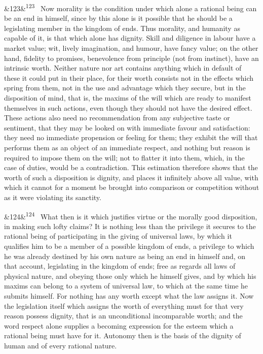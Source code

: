 \documentclass[12pt]{article}
\newcommand{\para}[1][]{\par\noindent\ifx&#1&\else\textsuperscript{\footnotesize #1}~\fi}
\begin{document}
\para[123] Now morality is the condition under which alone a rational being can be an end in himself, since by this alone is it possible that he should be a legislating member in the kingdom of ends. Thus morality, and humanity as capable of it, is that which alone has dignity. Skill and diligence in labour have a market value; wit, lively imagination, and humour, have fancy value; on the other hand, fidelity to promises, benevolence from principle (not from instinct), have an intrinsic worth. Neither nature nor art contains anything which in default of these it could put in their place, for their worth consists not in the effects which spring from them, not in the use and advantage which they secure, but in the disposition of mind, that is, the maxims of the will which are ready to manifest themselves in such actions, even though they should not have the desired effect. These actions also need no recommendation from any subjective taste or sentiment, that they may be looked on with immediate favour and satisfaction: they need no immediate propension or feeling for them; they exhibit the will that performs them as an object of an immediate respect, and nothing but reason is required to impose them on the will; not to flatter it into them, which, in the case of duties, would be a contradiction. This estimation therefore shows that the worth of such a disposition is dignity, and places it infinitely above all value, with which it cannot for a moment be brought into comparison or competition without as it were violating its sanctity.

\para[124] What then is it which justifies virtue or the morally good disposition, in making such lofty claims? It is nothing less than the privilege it secures to the rational being of participating in the giving of universal laws, by which it qualifies him to be a member of a possible kingdom of ends, a privilege to which he was already destined by his own nature as being an end in himself and, on that account, legislating in the kingdom of ends; free as regards all laws of physical nature, and obeying those only which he himself gives, and by which his maxims can belong to a system of universal law, to which at the same time he submits himself. For nothing has any worth except what the law assigns it. Now the legislation itself which assigns the worth of everything must for that very reason possess dignity, that is an unconditional incomparable worth; and the word respect alone supplies a becoming expression for the esteem which a rational being must have for it. Autonomy then is the basis of the dignity of human and of every rational nature.
\end{document}
